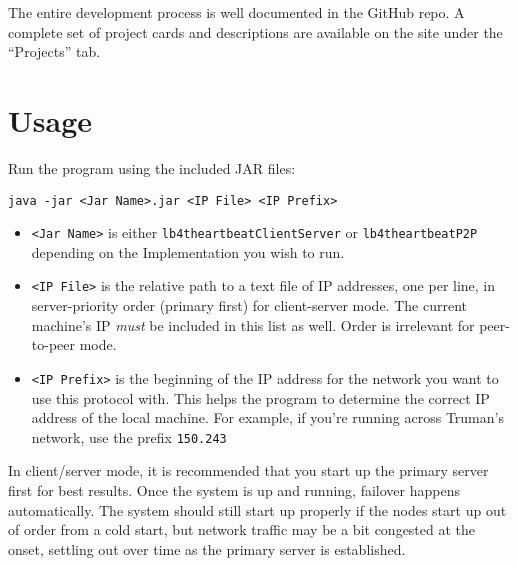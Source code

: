 \documentclass[11pt]{article}
\begin{document}
  The entire development process is well documented in the GitHub repo. A
  complete set of project cards and descriptions are available on the site 
  under the ``Projects'' tab.

  \section{Usage}
  Run the program using the included JAR files: 
  
  \noindent\texttt{java -jar <Jar Name>.jar <IP File> <IP Prefix>}

  \begin{itemize}
    \item \texttt{<Jar Name>} is either \texttt{lb4theartbeatClientServer} or \texttt{lb4theartbeatP2P} 
      depending on the Implementation you wish to run.
    \item \texttt{<IP File>} is the relative path to a text file of IP addresses, one per 
      line, in server-priority order (primary first) for client-server mode. The 
      current machine's IP \textit{must} be included in this list as well. Order is 
      irrelevant for peer-to-peer mode.
    \item \texttt{<IP Prefix>} is the beginning of the IP address for the network 
      you want to use this protocol with. This helps the program to determine the 
      correct IP address of the local machine. For example, if you're running 
      across Truman's network, use the prefix \texttt{150.243}
  \end{itemize}

  In client/server mode, it is recommended that you start up the primary server 
  first for best results. Once the system is up and running, failover happens 
  automatically. The system should still start up properly if the nodes start 
  up out of order from a cold start, but network traffic may be a bit 
  congested at the onset, settling out over time as the primary server is 
  established.
\end{document}
